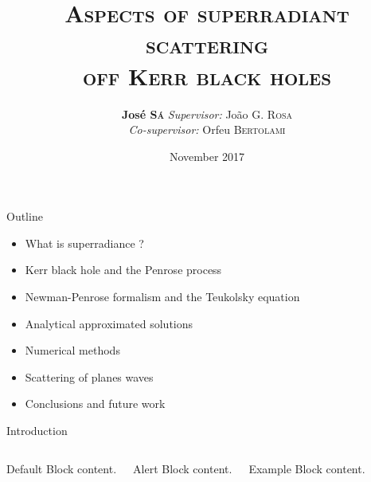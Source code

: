 \documentclass[9pt]{beamer}
\title{\scshape\LARGE Aspects of superradiant scattering \\ off Kerr black holes}
\date{November 2017}
\author{\textbf{José \textsc{Sá}} \hfill \textit{Supervisor:} João G. \textsc{Rosa} \\[0.15cm] \phantom{arg} \hfill \textit{Co-supervisor:} Orfeu \textsc{Bertolami} \\[0.4cm]}
\institute{Faculdade de Ciências da Universidade do Porto}
\begin{document}
\maketitle


\begin{frame}[fragile]{Outline}
    \begin{itemize}
        \large
        \setlength\itemsep{1.2em}
        \item What is superradiance ?
        \item Kerr black hole and the Penrose process
        \item Newman-Penrose formalism and the Teukolsky equation
        \item Analytical approximated solutions
        \item Numerical methods
        \item Scattering of planes waves 
        \item Conclusions and future work
    \end{itemize}
\end{frame}

{
    \begin{frame}[fragile]{Introduction}

        \begin{columns}[T,onlytextwidth]        
        
        
                \begin{block}{Default}
                Block content.
                \end{block}
        
                \begin{alertblock}{Alert}
                Block content.
                \end{alertblock}
        
                \begin{exampleblock}{Example}
                Block content.
                \end{exampleblock}
        
        \end{columns}

    \end{frame}
}
\end{document}
